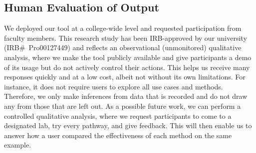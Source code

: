 \subsection{Human Evaluation of Output} 

We deployed our tool at a college-wide level and requested participation from faculty members. This research study has been IRB-approved by our university (IRB\#~Pro00127449) and reflects an observational (unmonitored) qualitative analysis, where we make the tool publicly available and give participants a demo of its usage but do not actively control their actions. This helps us receive many responses quickly and at a low cost, albeit not without its own limitations. For instance, it does not require users to explore all use cases and methods. Therefore, we only make inferences from data that is recorded and do not draw any from those that are left out. As a possible future work, we can perform a controlled qualitative analysis, where we request participants to come to a designated lab, try every pathway, and give feedback. This will then enable us to answer how a user compared the effectiveness of each method on the same example. 

